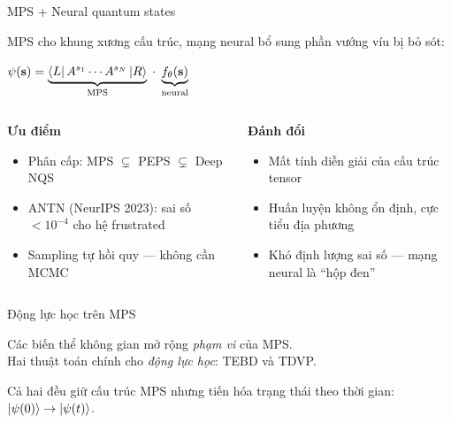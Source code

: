 \documentclass[aspectratio=169, 11pt]{beamer}
\newcommand{\eqn}[1]{\begin{center}\colorbox{eqbox}{\color{qcyan}$\displaystyle #1$}\end{center}}
\begin{document}
\begin{frame}[shrink=3]{MPS + Neural quantum states}

{\small MPS cho khung xương cấu trúc, mạng neural bổ sung phần vướng víu bị bỏ sót:}
\vspace{-2pt}
\eqn{\psi(\mathbf{s}) = \underbrace{\bra{L}A^{s_1}\cdots A^{s_N}\ket{R}}_{\text{MPS}}\;\cdot\;\underbrace{f_\theta(\mathbf{s})}_{\text{neural}}}

\begin{columns}[T]
\begin{column}{0.48\textwidth}

\textcolor{qgreen}{\textbf{Ưu điểm}}
{\small
\begin{itemize}
  \item Phân cấp: MPS $\subsetneq$ PEPS $\subsetneq$ Deep NQS
  \item ANTN (NeurIPS 2023): sai số $<10^{-4}$ cho hệ frustrated
  \item Sampling tự hồi quy — không cần MCMC
\end{itemize}}

\end{column}
\begin{column}{0.48\textwidth}

\textcolor{qpink}{\textbf{Đánh đổi}}
{\small
\begin{itemize}
  \item Mất tính diễn giải của cấu trúc tensor
  \item Huấn luyện không ổn định, cực tiểu địa phương
  \item Khó định lượng sai số — mạng neural là ``hộp đen''
\end{itemize}}

\end{column}
\end{columns}

\end{frame}

\begin{frame}{Động lực học trên MPS}

\vspace{14pt}
\begin{center}
{\large Các biến thể không gian mở rộng \textit{phạm vi} của MPS.\\[8pt]
Hai thuật toán chính cho \textit{động lực học}: TEBD và TDVP.}
\end{center}

\vspace{14pt}
{\small\textcolor{dimtext}{Cả hai đều giữ cấu trúc MPS nhưng tiến hóa trạng thái theo thời gian: $\ket{\psi(0)} \to \ket{\psi(t)}$.}}

\end{frame}
\end{document}
